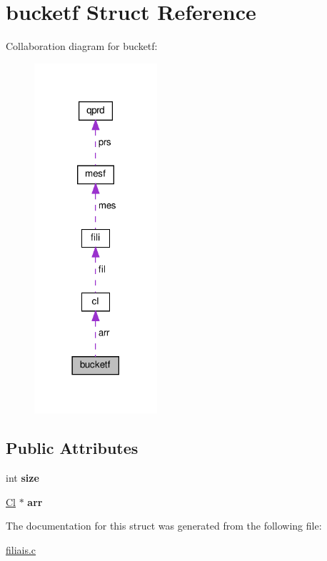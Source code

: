 \hypertarget{structbucketf}{}\section{bucketf Struct Reference}
\label{structbucketf}


Collaboration diagram for bucketf\+:
\nopagebreak
\begin{figure}[H]
\begin{center}
\leavevmode
\includegraphics[width=129pt]{structbucketf__coll__graph}
\end{center}
\end{figure}
\subsection*{Public Attributes}
\begin{DoxyCompactItemize}
\item 
\mbox{\label{structbucketf_acadddf33dfda3ab216eab6537cb79691}} 
int {\bfseries size}
\item 
\mbox{\label{structbucketf_ab98d2c8f780f43c782a92b9d6836e1cb}} 
\hyperlink{structcl}{Cl} $\ast$ {\bfseries arr}
\end{DoxyCompactItemize}


The documentation for this struct was generated from the following file\+:\begin{DoxyCompactItemize}
\item 
\hyperlink{filiais_8c}{filiais.\+c}\end{DoxyCompactItemize}
